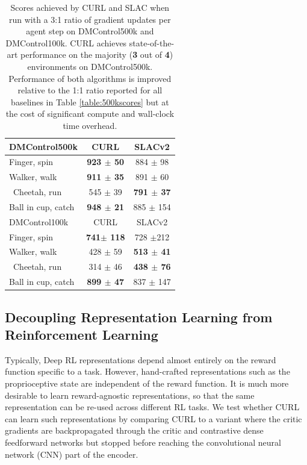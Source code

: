 \begin{table}[h!]
\caption{Scores achieved by CURL and SLAC when run with a 3:1 ratio of gradient updates per agent step on DMControl500k and DMControl100k. CURL achieves state-of-the-art performance on the majority (\textbf{3} out of \textbf{4}) environments on DMControl500k. Performance of both algorithms is improved relative to the 1:1 ratio reported for all baselines in Table \ref{table:500kscores} but at the cost of significant compute and wall-clock time overhead. }
\label{table:three_grad}
\vskip 0.15in
\begin{center}
\begin{small}
\begin{sc}
\begin{tabular}{lcc}
\toprule
DMControl500k & CURL & SLACv2 \\
\midrule
Finger, spin    & \textbf{923 $\pm$ 50} & 884 $\pm$ 98 \\
Walker, walk    & \textbf{911 $\pm$ 35} & 891  $\pm$ 60\\\
Cheetah, run    & 545 $\pm$ 39 & \textbf{791 $\pm$ 37}  \\
Ball in cup, catch   & \textbf{948 
$\pm$ 21 }  & 885 $\pm$ 154 \\
\midrule
DMControl100k & CURL & SLACv2 \\
\midrule
Finger, spin    & \textbf{ 741$\pm$ 118 }  & 728 $\pm$212  \\
Walker, walk    & 428 $\pm$ 59 & \textbf{513 $\pm$ 41}  \\\
Cheetah, run    & 314 $\pm$ 46 & \textbf{438 $\pm$ 76}  \\
Ball in cup, catch    & \textbf{ 899 $\pm$ 47 }& 837 $\pm$ 147  \\
\bottomrule
\end{tabular}
\end{sc}
\end{small}
\end{center}
\vskip -0.1in
\end{table}

 \subsection{Decoupling Representation Learning from Reinforcement Learning}

Typically, Deep RL representations depend almost entirely on the reward function specific to a task. However, hand-crafted representations such as the proprioceptive state are independent of the reward function. It is much more desirable to learn reward-agnostic representations, so that the same representation can be re-used across different RL tasks. We test whether CURL can learn such representations by comparing CURL to a variant where the critic gradients are backpropagated through the critic and contrastive dense feedforward networks but stopped before reaching the convolutional neural network (CNN) part of the encoder. 

